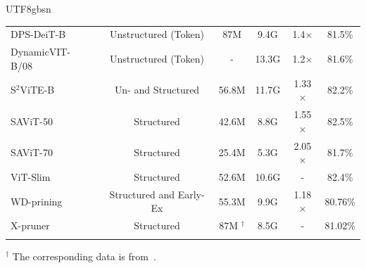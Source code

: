 \documentclass[10pt,journal,compsoc]{IEEEtran}
\newcommand{\<}{\left\langle}
\renewcommand{\>}{\right\rangle}
\newcommand{\1}{\mathbbm{1}}
\begin{document}
\begin{CJK}{UTF8}{gbsn}
\begin{table}[t]
\begin{tabular}{l|c|c|c|c|c}
		\hline
		DPS-DeiT-B~\cite{Tang2021PatchSF} & Unstructured (Token) & 87M & 9.4G & 1.4$\times$ & 81.5\% \\
		DynamicVIT-B/08~\cite{Rao2021DynamicViTEV}	& Unstructured (Token) & -	& 13.3G & 1.2$\times$ & 81.6\% \\
		S$^2$ViTE-B~\cite{Chen2021ChasingSI} & Un- and Structured &	56.8M &	11.7G &	1.33$\times$ &	82.2\% \\
		SAViT-50~\cite{Zheng2022SAViTSV} & Structured &	42.6M &	8.8G	&	1.55$\times$ &	82.5\% \\
		SAViT-70~\cite{Zheng2022SAViTSV} & Structured & 25.4M &	5.3G	&	2.05$\times$ &	81.7\% \\
		ViT-Slim~\cite{Chavan2022VisionTS} & Structured & 52.6M & 10.6G	&	-	& 82.4\% \\
		WD-prining~\cite{Yu2022WidthD} & Structured and Early-Ex & 55.3M	& 9.9G	&	1.18$\times$ &	80.76\% \\
		X-pruner~\cite{Yu2023XPrunerEP} & Structured & 87M	$^\dagger$	& 8.5G	& - &	81.02\% \\
		\Xhline{1pt}
	\end{tabular}
	\label{table:pr-cv}
	\begin{tablenotes}
		\item $^\dagger$ The corresponding data is from~\cite{Papa2023ASO}.
	\end{tablenotes}
\end{table}


\end{CJK}
\end{document}
